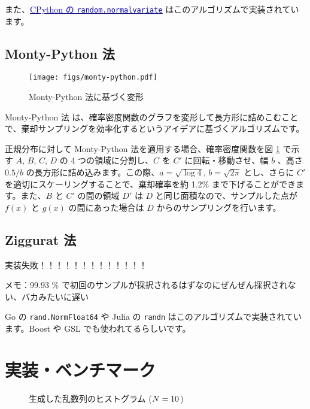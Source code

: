 \documentclass[twocolumn, dvipdfmx]{jsarticle}
\begin{document}
また、\href{https://github.com/python/cpython/blob/b0dfc7581697f20385813582de7e92ba6ba0105f/Lib/random.py#L529-L548}{\textcolor{blue}{\underline{CPython の \texttt{random.normalvariate}}}} はこのアルゴリズムで実装されています。

\subsection*{Monty-Python 法}

\begin{figure}[t]
    \centering
    \texttt{[image: figs/monty-python.pdf]}
    \caption{Monty-Python 法に基づく変形}
    \label{fig:monty-python-plot}
\end{figure}

Monty-Python 法 \cite{marsaglia1998monty} は、確率密度関数のグラフを変形して長方形に詰めこむことで、棄却サンプリングを効率化するというアイデアに基づくアルゴリズムです。

正規分布に対して Monty-Python 法を適用する場合、確率密度関数を図 \ref{fig:monty-python-plot} で示す $A$, $B$, $C$, $D$ の 4 つの領域に分割し、$C$ を $C'$ に回転・移動させ、幅 $b$ 、高さ $0.5/b$ の長方形に詰め込みます。この際、$a = \sqrt{\log 4}$, $b = \sqrt{2 \pi}$ とし、さらに $C'$ を適切にスケーリングすることで、棄却確率を約 1.2\% まで下げることができます。また、$B$ と $C'$ の間の領域 $D'$ は $D$ と同じ面積なので、サンプルした点が $f(x)$ と $g(x)$ の間にあった場合は $D$ からのサンプリングを行います。

\subsection*{Ziggurat 法}

実装失敗！！！！！！！！！！！！！ \cite{marsaglia1984fast} \cite{marsaglia2000ziggurat}

メモ：99.93 \% で初回のサンプルが採択されるはずなのにぜんぜん採択されない、バカみたいに遅い

Go の \texttt{rand.NormFloat64} や Julia の \texttt{randn} はこのアルゴリズムで実装されています。Boost や GSL でも使われてるらしいです。

\section*{実装・ベンチマーク}

\begin{figure}[t]
    \centering
    \begin{subfigmatrix}{3}
    \end{subfigmatrix}
    \caption{生成した乱数列のヒストグラム ($N = 10^{\protect}$)}
    \label{fig:histogram}
\end{figure}
\end{document}
